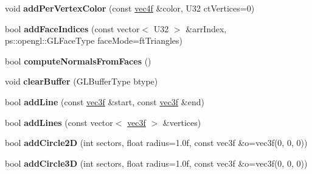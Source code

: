 \begin{DoxyCompactItemize}
\item 
\hypertarget{classps_1_1scene_1_1Geometry_a971e48f7d21975c9d9fb3bb33eebff61}{}void {\bfseries add\+Per\+Vertex\+Color} (const \hyperlink{classps_1_1base_1_1Vec4}{vec4f} \&color, U32 ct\+Vertices=0)\label{classps_1_1scene_1_1Geometry_a971e48f7d21975c9d9fb3bb33eebff61}

\item 
\hypertarget{classps_1_1scene_1_1Geometry_a9446984e251746380d5d937b3f9c8c66}{}bool {\bfseries add\+Face\+Indices} (const vector$<$ U32 $>$ \&arr\+Index, ps\+::opengl\+::\+G\+L\+Face\+Type face\+Mode=ft\+Triangles)\label{classps_1_1scene_1_1Geometry_a9446984e251746380d5d937b3f9c8c66}

\item 
\hypertarget{classps_1_1scene_1_1Geometry_a2da64558da7dc7c30105a412d89844a9}{}bool {\bfseries compute\+Normals\+From\+Faces} ()\label{classps_1_1scene_1_1Geometry_a2da64558da7dc7c30105a412d89844a9}

\item 
\hypertarget{classps_1_1scene_1_1Geometry_ab38a57abecb8385ce93457a2b8747ea1}{}void {\bfseries clear\+Buffer} (G\+L\+Buffer\+Type btype)\label{classps_1_1scene_1_1Geometry_ab38a57abecb8385ce93457a2b8747ea1}

\item 
\hypertarget{classps_1_1scene_1_1Geometry_ae42cbd9fb650f1117c8c6a9ceb2e9132}{}bool {\bfseries add\+Line} (const \hyperlink{classps_1_1base_1_1Vec3}{vec3f} \&start, const \hyperlink{classps_1_1base_1_1Vec3}{vec3f} \&end)\label{classps_1_1scene_1_1Geometry_ae42cbd9fb650f1117c8c6a9ceb2e9132}

\item 
\hypertarget{classps_1_1scene_1_1Geometry_a1f5252fb223fa253fddb1f5b242ba198}{}bool {\bfseries add\+Lines} (const vector$<$ \hyperlink{classps_1_1base_1_1Vec3}{vec3f} $>$ \&vertices)\label{classps_1_1scene_1_1Geometry_a1f5252fb223fa253fddb1f5b242ba198}

\item 
\hypertarget{classps_1_1scene_1_1Geometry_a41c90f08b712b9109047283f702618d7}{}bool {\bfseries add\+Circle2\+D} (int sectors, float radius=1.\+0f, const vec3f \&o=vec3f(0, 0, 0))\label{classps_1_1scene_1_1Geometry_a41c90f08b712b9109047283f702618d7}

\item 
\hypertarget{classps_1_1scene_1_1Geometry_a0a0a565babb0dc53cd93e6190b8cc5d1}{}bool {\bfseries add\+Circle3\+D} (int sectors, float radius=1.\+0f, const vec3f \&o=vec3f(0, 0, 0))\label{classps_1_1scene_1_1Geometry_a0a0a565babb0dc53cd93e6190b8cc5d1}


\end{DoxyCompactItemize}
